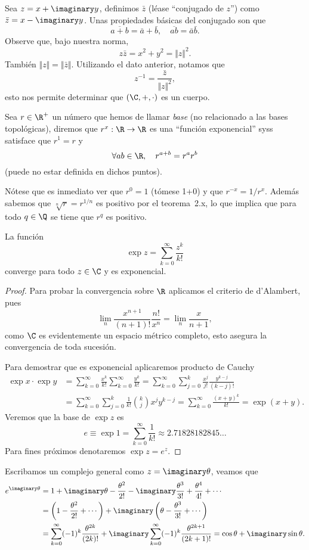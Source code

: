 \documentclass[11pt,oneside,a4paper]{book}
\begin{document}
Sea $z=x+\imaginary y$, definimos $\bar{z}$ (léase ``conjugado de $z$'') como $\bar{z}=x-\imaginary y$. Unas propiedades básicas del conjugado son que
$$\overline{a+b}=\bar a+\bar b,\quad\overline{ab}=\bar a\bar b.$$
Observe que, bajo nuestra norma,
$$z\bar{z}=x^2+y^2=\Vert z\Vert^2.$$
También $\Vert z\Vert=\Vert\bar z\Vert$. Utilizando el dato anterior, notamos que
\begin{equation}
z^{-1}=\frac{\bar z}{\Vert z\Vert^2},
\end{equation}
esto nos permite determinar que $(\C,+,\cdot)$ es un cuerpo.
\begin{mydef}
Sea $r\in\R^+$ un número que hemos de llamar \textit{base} (no relacionado a las bases topológicas), diremos que $r^x:\R\rightarrow\R$ es una ``función exponencial'' syss satisface que $r^1=r$ y 
$$\forall ab\in\R,\quad r^{a+b}=r^ar^b$$
(puede no estar definida en dichos puntos).
\end{mydef}
Nótese que es inmediato ver que $r^0=1$ (tómese 1+0) y que $r^{-x}=1/r^x$. Además sabemos que $\sqrt[n]{r}=r^{1/n}$ es positivo por el teorema~2.x, lo que implica que para todo $q\in\Q$ se tiene que $r^q$ es positivo.
\begin{thm}
La función
$$\exp z=\sum_{k=0}^\infty\frac{z^k}{k!}$$
converge para todo $z\in\C$ y es exponencial.
\end{thm}
\begin{proof}
Para probar la convergencia sobre $\R$ aplicamos el criterio de d'Alambert, pues
$$\lim_n\frac{x^{n+1}}{(n+1)!}\frac{n!}{x^n}=\lim_n\frac{x}{n+1},$$
como $\C$ es evidentemente un espacio métrico completo, esto asegura la convergencia de toda sucesión.

Para demostrar que es exponencial aplicaremos producto de Cauchy
\begin{align*}
\exp x\cdot\exp y&=\sum_{k=0}^\infty\frac{x^k}{k!}\sum_{k=0}^\infty\frac{y^k}{k!}=\sum_{k=0}^\infty\sum_{j=0}^k\frac{x^j}{j!}\frac{y^{k-j}}{(k-j)!}\\
&=\sum_{k=0}^\infty\sum_{j=0}^k\frac{1}{k!}\binom{k}{j}x^jy^{k-j}=\sum_{k=0}^\infty\frac{(x+y)^k}{k!}=\exp(x+y).
\end{align*}
Veremos que la base de $\exp z$ es
$$e\equiv\exp 1=\sum_{k=0}^\infty\frac{1}{k!}\approx 2.71828182845\dots$$
Para fines próximos denotaremos $\exp z=e^z$.
\end{proof}
Escribamos un complejo general como $z=\imaginary\theta$, veamos que
\begin{align}
e^{\imaginary\theta}&=1+\imaginary\theta-\frac{\theta^2}{2!}-\imaginary\frac{\theta^3}{3!}+\frac{\theta^4}{4!}+\cdots\notag\\
&=\left(1-\frac{\theta^2}{2!}+\cdots\right)+\imaginary\left(\theta-\frac{\theta^3}{3!}+\cdots\right)\notag\\
&=\sum_{k=0}^\infty(-1)^k\frac{\theta^{2k}}{(2k)!}+\imaginary\sum_{k=0}^\infty(-1)^k\frac{\theta^{2k+1}}{(2k+1)!}=\cos\theta+\imaginary\sin\theta.
\end{align}
\end{document}

